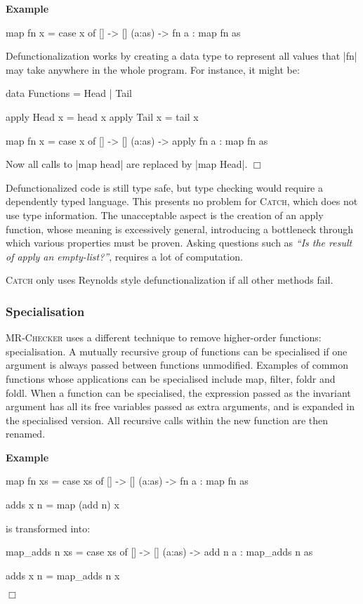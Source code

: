 \documentclass[preprint]{sigplanconf}
\newcommand{\C}[1]{\textsf{#1}}
\newcommand{\catch}{\textsc{Catch}}
\newcommand{\oldtool}{\anon{\catch05}{\textsc{MR-Checker}}}
\newcounter{exmp}
\newcommand{\yesexample}{\addtocounter{exmp}{1}\addvspace{2mm}\noindent\textbf{Example \arabic{exmp}}}
\newcommand{\noexample}{\hfill$\Box$\par\addvspace{2mm}}
\newcommand{\anon}[2]{#2}
\newenvironment{example}{\yesexample}{\noexample}
\begin{document}
\begin{example}
\begin{code}
map fn x = case  x of
                 []      -> []
                 (a:as)  -> fn a : map fn as
\end{code}

\noindent Defunctionalization works by creating a data type to represent all values that |fn| may take anywhere in the whole program. For instance, it might be:

\begin{code}
data Functions = Head | Tail

apply Head  x = head  x
apply Tail  x = tail  x

map fn x = case  x of
                 []      -> []
                 (a:as)  -> apply fn a : map fn as
\end{code}

Now all calls to |map head| are replaced by |map Head|.
\end{example}

Defunctionalized code is still type safe, but type checking would require a dependently typed language. This presents no problem for \catch{}, which does not use type information. The unacceptable aspect is the creation of an \C{apply} function, whose meaning is excessively general, introducing a bottleneck through which various properties must be proven. Asking questions such as \textit{``Is the result of \C{apply} an empty-list?''}, requires a lot of computation.

\catch{} only uses Reynolds style defunctionalization if all other methods fail.


\subsubsection{Specialisation}

\oldtool{} uses a different technique to remove higher-order functions: specialisation. A mutually recursive group of functions can be specialised if one argument is always passed between functions unmodified. Examples of common functions whose applications can be specialised include \C{map}, \C{filter}, \C{foldr} and \C{foldl}. When a function can be specialised, the expression passed as the invariant argument has all its free variables passed as extra arguments, and is expanded in the specialised version. All recursive calls within the new function are then renamed.

\begin{example}
\begin{code}
map fn xs = case  xs of
                  []      -> []
                  (a:as)  -> fn a : map fn as

adds x n = map (add n) x
\end{code}

\noindent is transformed into:

\begin{code}
map_adds n xs = case  xs of
                      []      -> []
                      (a:as)  -> add n a : map_adds n as

adds x n = map_adds n x
\end{code}
\end{example}
\end{document}
